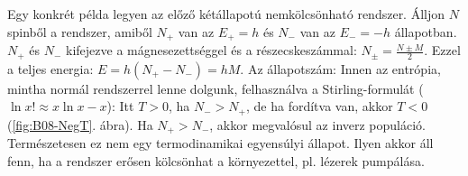    Egy konkrét példa legyen az előző kétállapotú nemkölcsönható rendszer. Álljon $N$ spinből a rendszer, amiből $N_+$ van az $E_+=h$ és $N_-$ van az $E_-=-h$ állapotban. $N_+$ és $N_-$ kifejezve a mágnesezettséggel és a részecskeszámmal: $N_\pm=\frac{N\pm M}{2}$. Ezzel a teljes energia: $E=h(N_+-N_-)=hM$. Az állapotszám:
   Innen az entrópia, mintha normál rendszerrel lenne dolgunk, felhasználva a Stirling-formulát ($\ln x!\approx x\ln x-x$):
   Itt $T>0$, ha $N_->N_+$, de ha fordítva van, akkor $T<0$ (\ref{fig:B08-NegT}. ábra). Ha $N_+>N_-$, akkor megvalósul az inverz populáció. Természetesen ez nem egy termodinamikai egyensúlyi állapot. Ilyen akkor áll fenn, ha a rendszer erősen kölcsönhat a környezettel, pl. lézerek pumpálása. 

